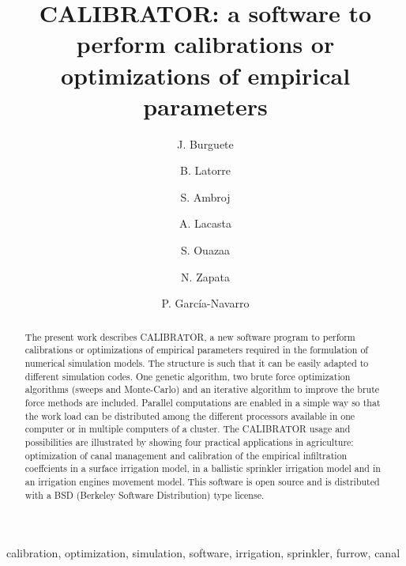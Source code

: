 \documentclass[review,authoryear]{elsarticle}
\begin{document}
\title{CALIBRATOR: a software to perform calibrations or optimizations of
empirical parameters}

\author[eead,bifi]{J. Burguete}

\author[eead]{B. Latorre}

\author[kit]{S. Ambroj}

\author[unizar]{A. Lacasta}

\author[eead]{S. Ouazaa}

\author[eead]{N. Zapata}

\author[unizar]{P. García-Navarro}


\address[eead]{Soil and Water, EEAD / CSIC.
P.O. Box 13034, 50080~Zaragoza, Spain.}
\address[bifi]{BIFI: Instituto de Biocomputación y Física de Sistemas Complejos,
Universidad de Zaragoza.
Mariano Esquillor, Edificio I+D, 50009~Zaragoza, Spain.}
\address[kit]{Steinbuch Centre for Computing (SCC),
Karlsruhe Institute of Technology (KIT).
KIT-Campus Nord, Hermann von Helmholtzplatz 1, 76344 Eggenstein - Leopoldshafen,
Germany.}
\address[unizar]{Fluid Mechanics, LIFTEC, CSIC-Universidad de Zaragoza.
María de Luna 3, 50018~Zaragoza, Spain.}

\begin{keyword}
calibration, optimization, simulation, software, irrigation, sprinkler, furrow,
canal
\end{keyword}

\begin{abstract}
The present work describes CALIBRATOR, a new software program to perform
calibrations or optimizations of empirical parameters required in the
formulation of numerical simulation models. The structure is such that it can be
easily adapted to different simulation codes.
One genetic algorithm, two brute force optimization algorithms (sweeps and
Monte-Carlo) and an iterative algorithm to improve the brute force methods are
included.
Parallel computations are enabled in a simple way so that the work load can be
distributed among the different processors available in one computer or in
multiple computers of a cluster.
The CALIBRATOR usage and possibilities are illustrated by showing four practical
applications in agriculture: optimization of canal management and calibration of
the empirical infiltration coeffcients in a surface irrigation model, in a
ballistic sprinkler irrigation model and in an irrigation engines movement
model.
This software is open source and is distributed with a BSD (Berkeley Software
Distribution) type license.
\end{abstract}
\end{document}
